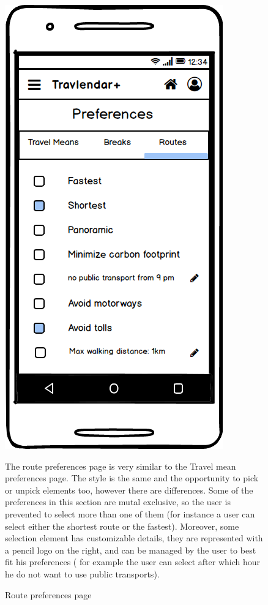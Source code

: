		\begin{figure}
		\centering
		\includegraphics[width=0.6\linewidth]{mockups/PreferencesRoutes}
		\caption{Route preferences page}
		\label{fig:preferencesroutes}
		\begin{center}
			The route preferences page is very similar to the Travel mean preferences page. The style is the same and the opportunity to pick or unpick elements too, however there are differences. Some of the preferences in this section are mutal exclusive, so the user is prevented to select more than one of them (for instance a user can select either the shortest route or the fastest). Moreover, some selection element has customizable details, they are represented with a pencil logo on the right, and can be managed by the user to best fit his preferences ( for example the user can select after which hour he do not want to use public transports).
		\end{center}
	\end{figure}
	